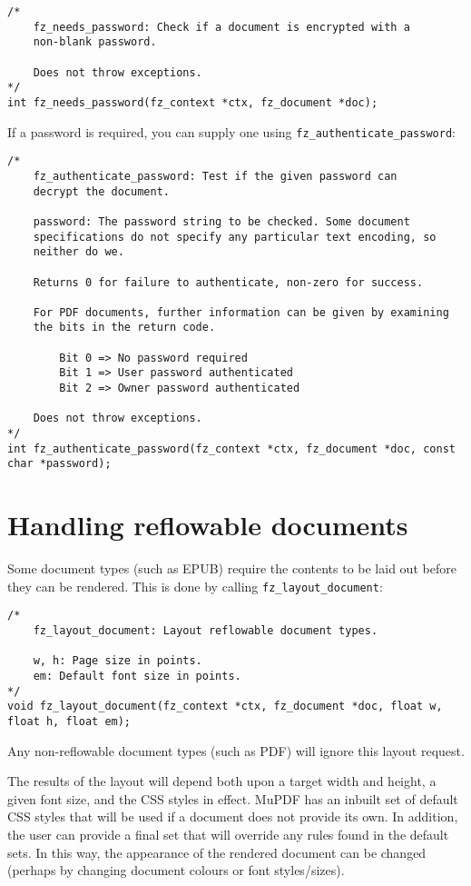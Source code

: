 \documentclass[oneside]{book}
\begin{document}
\begin{lstlisting}
/*
	fz_needs_password: Check if a document is encrypted with a
	non-blank password.

	Does not throw exceptions.
*/
int fz_needs_password(fz_context *ctx, fz_document *doc);
\end{lstlisting}

If a password is required, you can supply one using \texttt{fz\_authenticate\_password}:

\begin{lstlisting}
/*
	fz_authenticate_password: Test if the given password can
	decrypt the document.

	password: The password string to be checked. Some document
	specifications do not specify any particular text encoding, so
	neither do we.

	Returns 0 for failure to authenticate, non-zero for success.

	For PDF documents, further information can be given by examining
	the bits in the return code.

		Bit 0 => No password required
		Bit 1 => User password authenticated
		Bit 2 => Owner password authenticated

	Does not throw exceptions.
*/
int fz_authenticate_password(fz_context *ctx, fz_document *doc, const char *password);
\end{lstlisting}


\section{Handling reflowable documents}

Some document types (such as EPUB) require the contents to be laid out before they can be rendered. This is done by calling \texttt{fz\_layout\_document}:

\begin{lstlisting}
/*
	fz_layout_document: Layout reflowable document types.

	w, h: Page size in points.
	em: Default font size in points.
*/
void fz_layout_document(fz_context *ctx, fz_document *doc, float w, float h, float em);
\end{lstlisting}

Any non-reflowable document types (such as PDF) will ignore this layout request.

The results of the layout will depend both upon a target width and height, a given font size, and the CSS styles in effect. MuPDF has an inbuilt set of default CSS styles that will be used if a document does not provide its own. In addition, the user can provide a final set that will override any rules found in the default sets. In this way, the appearance of the rendered document can be changed (perhaps by changing document colours or font styles/sizes).
\end{document}
